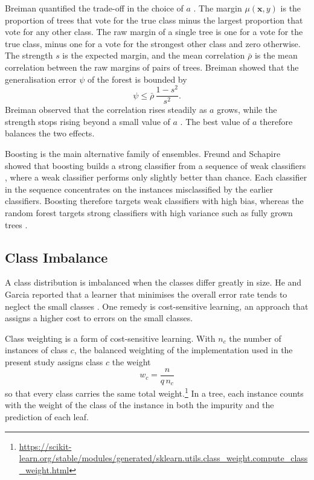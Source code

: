 \documentclass[conference]{IEEEtran}
\begin{document}
Breiman quantified the trade-off in the choice of $a$ \cite{breiman2001}. The
margin $\mu(\mathbf{x}, y)$ is the proportion of trees that vote for the true class
minus the largest proportion that vote for any other class. The raw margin of a single tree is one for a vote for the true class,
minus one for a vote for the strongest other class and zero otherwise. The
strength $s$ is the expected margin, and the mean correlation $\bar{\rho}$ is the
mean correlation between the raw margins of pairs of trees. Breiman showed that the generalisation error
$\psi$ of the forest is bounded by
\begin{equation}
\psi \leq \bar{\rho}\,\frac{1 - s^2}{s^2} .
\end{equation}
Breiman observed that the correlation rises steadily as $a$ grows, while the
strength stops rising beyond a small value of $a$ \cite{breiman2001}. The best value
of $a$ therefore balances the two effects.

Boosting is the main alternative family of ensembles. Freund and Schapire showed
that boosting builds a strong classifier from a sequence of weak classifiers
\cite{freund1997}, where a weak classifier performs only slightly better than
chance. Each classifier in the sequence concentrates on the instances
misclassified by the earlier classifiers. Boosting therefore targets weak
classifiers with high bias, whereas the random forest targets strong classifiers with high variance such as
fully grown trees \cite{hastie2009}.

\subsection{Class Imbalance}

A class distribution is imbalanced when the classes differ greatly in size. He and
Garcia reported that a learner that minimises the overall error rate tends to neglect
the small classes \cite{he2009}. One remedy is cost-sensitive learning, an approach
that assigns a higher cost to errors on the small classes.

Class weighting is a form of cost-sensitive learning. With $n_c$ the number of
instances of class $c$, the balanced weighting of the implementation used in the
present study assigns class $c$ the weight
\begin{equation}
w_c = \frac{n}{q\, n_c}
\end{equation}
so that every class carries the same total
weight.\footnote{\url{https://scikit-learn.org/stable/modules/generated/sklearn.utils.class_weight.compute_class_weight.html}}
In a tree, each instance counts with the weight of the class of the instance in
both the impurity and the prediction of each leaf.
\end{document}
